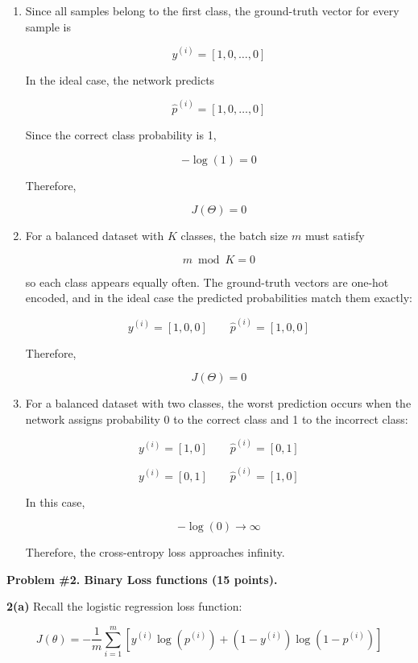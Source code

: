 \documentclass[12pt]{article}
\begin{document}
	\begin{enumerate}[itemsep=2pt]
		
		\item[(i)] Since all samples belong to the first class, the ground-truth vector for every sample is
		
		\[
		y^{(i)} = [1,0,\ldots,0]
		\]
		
		In the ideal case, the network predicts
		
		\[
		\hat{p}^{(i)} = [1,0,\ldots,0]
		\]
		
		Since the correct class probability is 1,
		
		\[
		-\log(1)=0
		\]
		
		Therefore,
		
		\[
		J(\Theta)=0
		\]
		
		\item[(ii)] For a balanced dataset with \(K\) classes, the batch size \(m\) must satisfy
		
		\[
		m \bmod K = 0
		\]
		
		so each class appears equally often. The ground-truth vectors are one-hot encoded, and in the ideal case the predicted probabilities match them exactly:
		
		\[
		y^{(i)}=[1,0,0]
		\qquad
		\hat{p}^{(i)}=[1,0,0]
		\]
		
		Therefore,
		
		\[
		J(\Theta)=0
		\]
		
		\item[(iii)] For a balanced dataset with two classes, the worst prediction occurs when the network assigns probability 0 to the correct class and 1 to the incorrect class:
		
		\[
		y^{(i)}=[1,0]
		\qquad
		\hat{p}^{(i)}=[0,1]
		\]
		
		\[
		y^{(i)}=[0,1]
		\qquad
		\hat{p}^{(i)}=[1,0]
		\]
		
		In this case,
		
		\[
		-\log(0)\rightarrow\infty
		\]
		
		Therefore, the cross-entropy loss approaches infinity.
		
	\end{enumerate}
	
	\newpage
	
	\noindent\textbf{Problem \#2. Binary Loss functions (15 points).}
	
	\noindent\textbf{2(a)} Recall the logistic regression loss function:
	
	\[
	J(\theta)
	=
	-\frac{1}{m}
	\sum_{i=1}^{m}
	\left[
	y^{(i)}\log\left(p^{(i)}\right)
	+
	\left(1-y^{(i)}\right)\log\left(1-p^{(i)}\right)
	\right]
	\]
	
\end{document}
